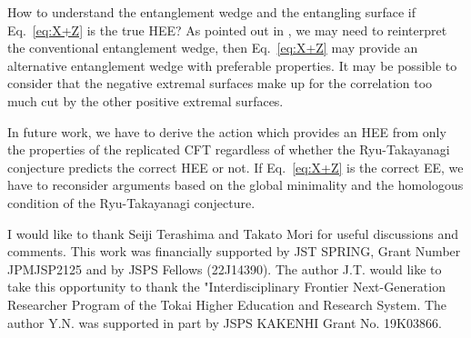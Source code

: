 \documentclass[%
 reprint,
 amsmath,amssymb,
 aps,
]{revtex4-2}
\begin{document}
    How to understand the entanglement wedge and the entangling surface if Eq.~\eqref{eq:X+Z} is the true HEE? As pointed out in \cite{Terashima:2020uqu}, we may need to reinterpret the conventional entanglement wedge, then Eq.~\eqref{eq:X+Z} may provide an alternative entanglement wedge with preferable properties. It may be possible to consider that the negative extremal surfaces make up for the correlation too much cut by the other positive extremal surfaces.


    In future work, we have to derive the action which provides an HEE from only the properties of the replicated CFT regardless of whether the Ryu-Takayanagi conjecture predicts the correct HEE or not. If Eq.~\eqref{eq:X+Z} is the correct EE, we have to reconsider arguments based on the global minimality and the homologous condition of the Ryu-Takayanagi conjecture. 


\begin{acknowledgments}
    I would like to thank Seiji Terashima and Takato Mori for useful discussions and comments. This work was financially supported by JST SPRING, Grant Number JPMJSP2125 and by JSPS Fellows (22J14390). The author J.T. would like to take this opportunity to thank the "Interdisciplinary Frontier Next-Generation Researcher Program of the Tokai Higher Education and Research System. The author Y.N. was supported in part by JSPS KAKENHI Grant No. 19K03866.
\end{acknowledgments}


\end{document}
